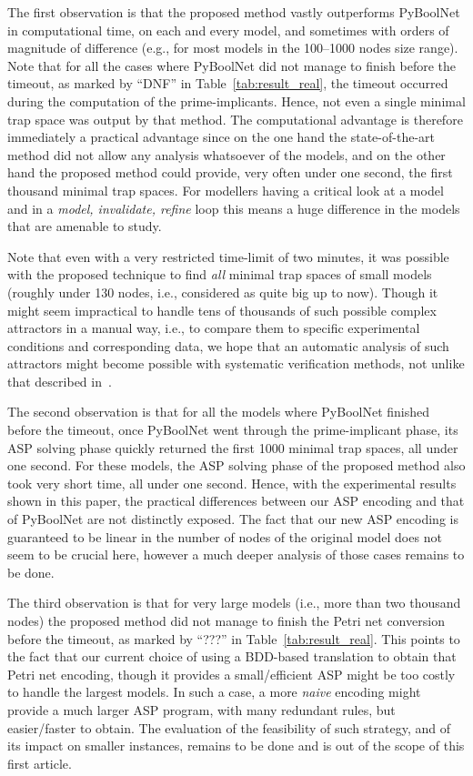 \documentclass[runningheads]{llncs}
\begin{document}
The first observation is that the proposed method vastly outperforms PyBoolNet in computational time, on each and every model, and sometimes with orders of magnitude of difference (e.g., for most models in the 100--1000 nodes size range).
Note that for all the cases where PyBoolNet did not manage to finish before the timeout, as marked by ``DNF'' in Table~\ref{tab:result_real}, the timeout occurred during the computation of the prime-implicants.
Hence, not even a single minimal trap space was output by that method.
The computational advantage is therefore immediately a practical advantage since on the one hand the state-of-the-art method did not allow any analysis whatsoever of the models, and on the other hand the proposed method could provide, very often under one second, the first thousand minimal trap spaces.
For modellers having a critical look at a model and in a \emph{model, invalidate, refine} loop this means a huge difference in the models that are amenable to study.

Note that even with a very restricted time-limit of two minutes, it was possible with the proposed technique to find \emph{all} minimal trap spaces of small models (roughly under 130 nodes, i.e., considered as quite big up to now).
Though it might seem impractical to handle tens of thousands of such possible complex attractors in a manual way, i.e., to compare them to specific experimental conditions and corresponding data, we hope that an automatic analysis of such attractors might become possible with systematic verification methods, not unlike that described in~\cite{hernandez2020computational}.

The second observation is that for all the models where PyBoolNet finished before the timeout, once PyBoolNet went through the prime-implicant phase, its ASP solving phase quickly returned the first 1000 minimal trap spaces, all under one second.
For these models, the ASP solving phase of the proposed method also took very short time, all under one second.
Hence, with the experimental results shown in this paper, the practical differences between our ASP encoding and that of PyBoolNet are not distinctly exposed.
The fact that our new ASP encoding is guaranteed to be linear in the number of nodes of the original model does not seem to be crucial here, however a much deeper analysis of those cases remains to be done.

The third observation is that for very large models (i.e., more than two thousand nodes) the proposed method did not manage to finish the Petri net conversion before the timeout, as marked by ``???'' in Table~\ref{tab:result_real}.
This points to the fact that our current choice of using a BDD-based translation to obtain that Petri net encoding, though it provides a small/efficient ASP might be too costly to handle the largest models.
In such a case, a more \emph{naive} encoding might provide a much larger ASP program, with many redundant rules, but easier/faster to obtain.
The evaluation of the feasibility of such strategy, and of its impact on smaller instances, remains to be done and is out of the scope of this first article.
\end{document}
